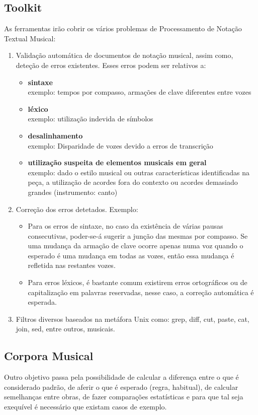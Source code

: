 \documentclass[runningheads,a4paper]{llncs}
\begin{document}
\subsection*{Toolkit}
As ferramentas irão cobrir os vários problemas de Processamento de Notação Textual Musical:
\begin{enumerate}
\item Validação automática de documentos de notação musical, assim como, deteção de erros
existentes. Esses erros podem ser relativos a: 
\begin{itemize}
\item \textbf{sintaxe}\\
exemplo: tempos por compasso, armações de clave diferentes entre vozes
\item \textbf{léxico}\\
exemplo: utilização indevida de símbolos
\item \textbf{desalinhamento}\\
exemplo: Disparidade de vozes devido a erros de transcrição
\item \textbf{utilização suspeita de elementos musicais em geral}\\
exemplo: dado o estilo musical ou outras características identificadas na peça, a utilização de
acordes fora do contexto ou acordes demasiado grandes (instrumento: canto)
\end{itemize}
\item Correção dos erros detetados. Exemplo:
\begin{itemize}
\item Para os erros de sintaxe, no caso da existência de várias pausas consecutivas, poder-se-á
sugerir a junção das mesmas por compasso. Se uma mudança da armação de clave ocorre apenas numa voz
quando o esperado é uma mudança em todas as vozes, então essa mudança é refletida nas restantes
vozes.
\item Para erros léxicos, é bastante comum existirem erros ortográficos ou de capitalização em
palavras reservadas, nesse caso, a correção automática é esperada.
\end{itemize}

\item Filtros diversos baseados na metáfora Unix como: grep, diff, cut, paste, cat, join, sed, entre
outros, musicais.
\end{enumerate}

\subsection*{Corpora Musical}
Outro objetivo passa pela possibilidade de calcular a diferença entre o que é considerado padrão, de
aferir o que é esperado (regra, habitual), de calcular semelhanças entre obras, de fazer comparações
estatísticas e para que tal seja exequível é necessário que existam casos de exemplo.
\end{document}
